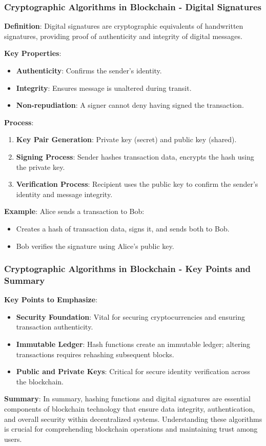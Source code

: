 \documentclass{beamer}
\begin{document}
\begin{frame}[fragile]
    \frametitle{Cryptographic Algorithms in Blockchain - Digital Signatures}
    \textbf{Definition}: Digital signatures are cryptographic equivalents of handwritten signatures, providing proof of authenticity and integrity of digital messages.

    \textbf{Key Properties}:
    \begin{itemize}
        \item \textbf{Authenticity}: Confirms the sender’s identity.
        \item \textbf{Integrity}: Ensures message is unaltered during transit.
        \item \textbf{Non-repudiation}: A signer cannot deny having signed the transaction.
    \end{itemize}

    \textbf{Process}:
    \begin{enumerate}
        \item \textbf{Key Pair Generation}: Private key (secret) and public key (shared).
        \item \textbf{Signing Process}: Sender hashes transaction data, encrypts the hash using the private key.
        \item \textbf{Verification Process}: Recipient uses the public key to confirm the sender’s identity and message integrity.
    \end{enumerate}

    \textbf{Example}: Alice sends a transaction to Bob:
    \begin{itemize}
        \item Creates a hash of transaction data, signs it, and sends both to Bob.
        \item Bob verifies the signature using Alice’s public key.
    \end{itemize}
\end{frame}

\begin{frame}[fragile]
    \frametitle{Cryptographic Algorithms in Blockchain - Key Points and Summary}
    \textbf{Key Points to Emphasize}:
    \begin{itemize}
        \item \textbf{Security Foundation}: Vital for securing cryptocurrencies and ensuring transaction authenticity.
        \item \textbf{Immutable Ledger}: Hash functions create an immutable ledger; altering transactions requires rehashing subsequent blocks.
        \item \textbf{Public and Private Keys}: Critical for secure identity verification across the blockchain.
    \end{itemize}

    \textbf{Summary}: 
    In summary, hashing functions and digital signatures are essential components of blockchain technology that ensure data integrity, authentication, and overall security within decentralized systems. Understanding these algorithms is crucial for comprehending blockchain operations and maintaining trust among users.
\end{frame}
\end{document}
